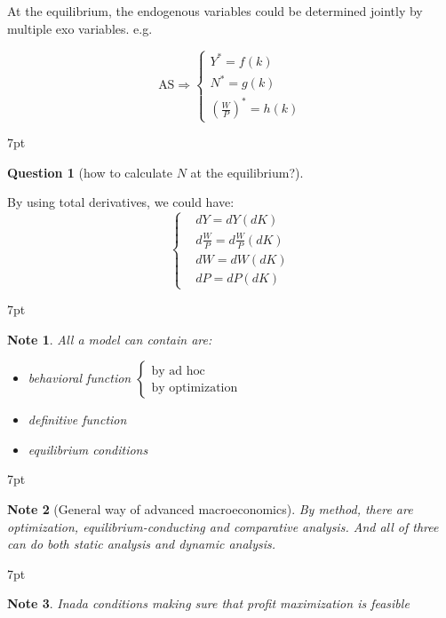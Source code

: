 \documentclass{article}
\providecommand{\tightlist}{
  \setlength{\itemsep}{0pt}
  \setlength{\parskip}{0pt}}
\newenvironment{blueblock}{
\def\FrameCommand{
  \hspace{1pt}
    {\color{DarkBlue}
    \vrule width 2pt}
    {\color{blueshade}
    \vrule width 4pt}
  \colorbox{blueshade}
}
\MakeFramed{
  \advance
  \hsize-
  \width
  \FrameRestore}
\noindent\hspace{-4.55pt}%
\begin{adjustwidth}{}{7pt}
\vspace{2pt}\vspace{2pt}
}
{\vspace{2pt}\end{adjustwidth}\endMakeFramed}
\newenvironment{redblock}{
\def\FrameCommand{
  \hspace{1pt}
    {\color{LightCoral}
    \vrule width 2pt}
    {\color{redshade}
    \vrule width 4pt}
  \colorbox{redshade}
}
\MakeFramed{
  \advance
  \hsize-
  \width
  \FrameRestore}
\noindent\hspace{-4.55pt}%
\begin{adjustwidth}{}{7pt}
\vspace{2pt}\vspace{2pt}
}
{\vspace{2pt}\end{adjustwidth}\endMakeFramed}
\newtheorem{question}{Question}
\newtheorem{note}{Note}
\begin{document}
At the equilibrium, the endogenous variables could be determined jointly
by multiple exo variables. e.g. 

$$
\text{AS}
 \Rightarrow 
\begin{cases}
Y^{*}=f(k) \\
N^{*}=g(k) \\
(\frac{W}{P})^{*}=h(k) 
\end{cases}
$$


\begin{redblock}
\begin{question}[how to calculate $N$ at the equilibrium?]
\end{question}
By using total derivatives, we could have: 
$$\begin{cases}
&dY=dY(dK)
\\&d \frac{W}{P}=d \frac{W}{P}(dK)
\\&dW=dW(dK)
\\&dP=dP(dK)
\end{cases}$$
\end{redblock}

\begin{blueblock}
\begin{note}
All a model can contain are: 
\begin{itemize}
\tightlist
  \item behavioral function 
    $\begin{cases}
      \text{by ad hoc} \\
      \text{by optimization}
    \end{cases}$
  \item definitive function 
  \item equilibrium conditions
\end{itemize}
\end{note}
\end{blueblock}

\begin{blueblock}
\begin{note}[General way of advanced macroeconomics]
By method, there are optimization, equilibrium-conducting and comparative analysis. And all of three can do both static analysis and dynamic analysis.
\end{note}
\end{blueblock}


\begin{blueblock}
\begin{note}  
Inada conditions making sure that profit maximization is feasible
\end{note}
\end{blueblock}
\end{document}
